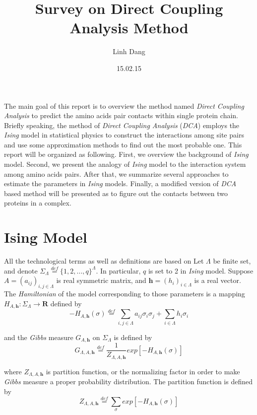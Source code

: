 \documentclass[a4paper,12pt]{article}
\begin{document}
\title{Survey on Direct Coupling Analysis Method}
\author{Linh Dang}
\date{15.02.15} 
\maketitle

The main goal of this report is to overview the method named \emph {Direct Coupling Analysis} to predict the amino acids pair contacts within single protein chain. Briefly speaking, the method of \emph {Direct Coupling Analysis} (\emph{DCA}) employs the \emph {Ising} model in statistical physics to construct the interactions among site pairs and use some approximation methods to find out the most probable one. This report will be organized as following. First, we overview the background of \emph {Ising} model. Second, we present the analogy of \emph {Ising} model to the interaction system among amino acids pairs. After that, we summarize several approaches to estimate the parameters in \emph {Ising} models. Finally, a modified version of \emph {DCA} based method will be presented as to figure out the contacts between two proteins in a complex. 

\section{Ising Model}
All the technological terms as well as definitions are based on \cite{Bolthausen2007}
Let $ \Lambda $ be finite set, and denote $ \Sigma_\Lambda \stackrel{def}{=}\{ 1,2,...,q\}^\Lambda$. In particular, $ q $ is set to 2 in \emph {Ising} model. Suppose $ A = (a_{ij})_{i,j \in \Lambda} $ is real symmetric matrix, and $ \textbf{h} = (h_i)_{i \in \Lambda}$ is a real vector. The \emph {Hamiltonian} of the model corresponding to those parameters is a mapping $ H_{A,\textbf{h}} \colon \Sigma_\Lambda \to \textbf{R} $ defined by
\begin{equation} \label{eq1}
 -H_{A,\textbf{h}}(\sigma) \stackrel{def}{=}  \sum_{i,j \in \Lambda} a_{ij}\sigma_i \sigma_j + \sum_{i \in \Lambda} h_i \sigma_i 
\end{equation}

and the \emph{Gibbs} measure $ G_{A,\textbf{h}} $ on $\Sigma_\Lambda$ is defined by 
\begin{equation} \label{eq2}
 G_{\Lambda,A,\textbf{h}} \stackrel{def}{=} \frac{1}{Z_{\Lambda,A,\textbf{h}}} exp \left[ -H_{A,\textbf{h}}(\sigma) \right] 
\end{equation}

where $ Z_{\Lambda,A,\textbf{h}} $ is partition function, or the normalizing factor in order to make \emph{Gibbs} measure a proper probability distribution. The partition function is defined by
\begin{equation} \label{eq3}
 Z_{\Lambda,A,\textbf{h}} \stackrel{def}{=} \sum_\sigma exp \left[ -H_{A,\textbf{h}}(\sigma) \right] 
\end{equation}
\end{document}
